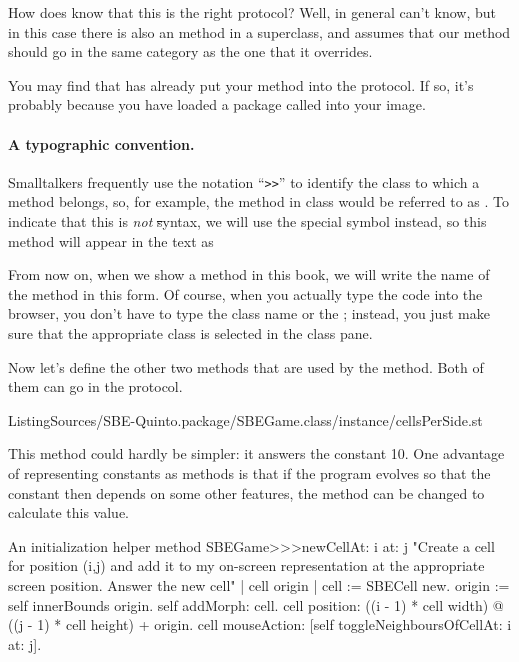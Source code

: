 \documentclass[a4paper,10pt,twoside]{book}
\begin{document}
How does \squeak{} know that this is the right protocol?  Well, in general \squeak{} can't know, but in this case there is also an  method in a superclass, and \squeak assumes that our  method should go in the same category as the one that it overrides.

You may find that \squeak has already put your  method into the  protocol.
If so, it's probably because you have loaded a package called  into your image.

\paragraph{A typographic convention.} Smalltalkers frequently use the notation ``\verb|>>|'' to identify the class to which a method belongs, so, for example, the  method in class  would be referred to as .
To indicate that this is \emph{not} \st syntax, we will use the special symbol \ct{>>>} instead, so this method will appear in the text as 

From now on, when we show a method in this book, we will write the name of the method in this form.  Of course, when you actually type the code into the browser, you don't have to type the class name or the \ct{>>>}; instead, you just make sure that the appropriate class is selected in the class pane.  

Now let's define the other two methods that are used by the  method. Both of them can go in the  protocol.

%
{ListingSources/SBE-Quinto.package/SBEGame.class/instance/cellsPerSide.st}	

This method could hardly be simpler: it answers the constant 10.  One advantage of representing constants as methods is that if the program evolves so that the constant then depends on some other features, the method can be changed to calculate this value.

\begin{method}[newCellAt:at:]{An initialization helper method}
SBEGame>>>newCellAt: i at: j 
	"Create a cell for position (i,j) and add it to my on-screen
	representation at the appropriate screen position.  Answer the new cell"
	| cell origin |
	cell := SBECell new.
	origin := self innerBounds origin.
	self addMorph: cell.
	cell position: ((i - 1) * cell width) @ ((j - 1) * cell height) + origin.
	cell mouseAction: [self toggleNeighboursOfCellAt: i at: j].
\end{method}
\end{document}
